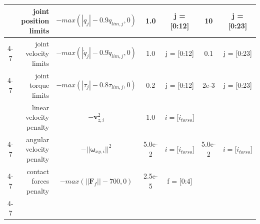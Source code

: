 \documentclass[9pt,twocolumn,twoside]{osajnl}
\begin{document}
\begin{table}[h]
\begin{tabular}{|crc|cc|cc|}
\multicolumn{1}{|c|}{}                              & joint position limits                   & $- max (|q_j| - 0.9q_{lim, j}, 0)$                   & \multicolumn{1}{c|}{1.0} & j = {[}0:12{]} & \multicolumn{1}{c|}{10}                          & j = {[}0:23{]}                                                                                               \\ \cline{4-7} 
\multicolumn{1}{|c|}{}                              & joint velocity limits                   & $- max (|\dot{q}_j| - 0.9\dot{q}_{lim, j}, 0)$    & \multicolumn{1}{c|}{1.0}                         & j = {[}0:12{]}                         & \multicolumn{1}{c|}{0.1} & j = {[}0:23{]}                                                                       \\ \cline{4-7} 
\multicolumn{1}{|c|}{\multirow{-8}{*}{Regulations}} & joint torque limits                     & $- max (|\tau_j| - 0.8\tau_{lim, j}, 0)$          & \multicolumn{1}{c|}{0.2}                         & j = {[}0:12{]}                         & \multicolumn{1}{c|}{2e-3}                        & j = {[}0:23{]}                                                                                               \\ \hline
\multicolumn{1}{|c|}{}                              & linear velocity penalty                 & $-\mathbf{v}_{z, i}^2$                                             & \multicolumn{1}{c|}{1.0}                         & $i = {[}i_{torso}{]}$                 & \multicolumn{1}{c|}{\cellcolor[HTML]{9B9B9B}}    & \cellcolor[HTML]{9B9B9B}                                                                                     \\ \cline{4-7} 
\multicolumn{1}{|c|}{}                              & angular velocity penalty                & $-||\boldsymbol{\omega}_{xy, i}||^2$                               & \multicolumn{1}{c|}{5.0e-2}                      & $i = {[}i_{torso}{]}$                 & \multicolumn{1}{c|}{5.0e-2}                      & $i = {[}i_{torso}{]}$                                                                                       \\ \cline{4-7} 
\multicolumn{1}{|c|}{}                              & contact forces penalty                  & $-max(||\mathbf{F}_f|| - 700, 0)$                  & \multicolumn{1}{c|}{2.5e-5}                      & f = {[}0:4{]}                          & \multicolumn{1}{c|}{\cellcolor[HTML]{9B9B9B}}    & \cellcolor[HTML]{9B9B9B}                                                                                     \\ \cline{4-7} 

\end{tabular}
\end{table}
\end{document}
